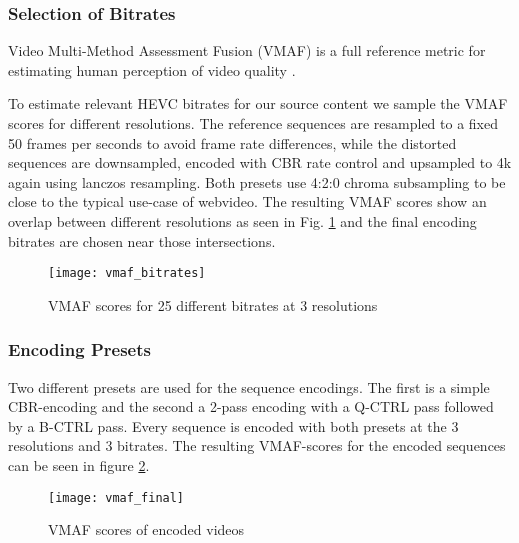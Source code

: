 \subsubsection{Selection of Bitrates}
Video Multi-Method Assessment Fusion (VMAF) is a full reference metric for estimating human perception of video quality \cite{lin2014:fvqa}.

To estimate relevant HEVC bitrates for our source content we sample the VMAF scores for different resolutions. The reference sequences are resampled to a fixed 50 frames per seconds to avoid frame rate differences, while the distorted sequences are downsampled, encoded with CBR rate control and upsampled to 4k again using lanczos resampling. Both presets use 4:2:0 chroma subsampling to be close to the typical use-case of webvideo. The resulting VMAF scores show an overlap between different resolutions as seen in Fig. \ref{fig:vmaf:bitrates} and the final encoding bitrates are chosen near those intersections.

\begin{figure}[!t]
	\centering
	\texttt{[image: vmaf\_bitrates]}
	\caption{VMAF scores for 25 different bitrates at 3 resolutions}
	\label{fig:vmaf:bitrates}
\end{figure}

\subsubsection{Encoding Presets}
Two different presets are used for the sequence encodings. The first is a simple CBR-encoding and the second a 2-pass encoding with a Q-CTRL pass followed by a B-CTRL pass. Every sequence is encoded with both presets at the 3 resolutions and 3 bitrates. The resulting VMAF-scores for the encoded sequences can be seen in figure \ref{fig:vmaf:encoded}.


\begin{figure}[!t]
	\centering
	\texttt{[image: vmaf\_final]}
	\caption{VMAF scores of encoded videos}
	\label{fig:vmaf:encoded}
\end{figure}
